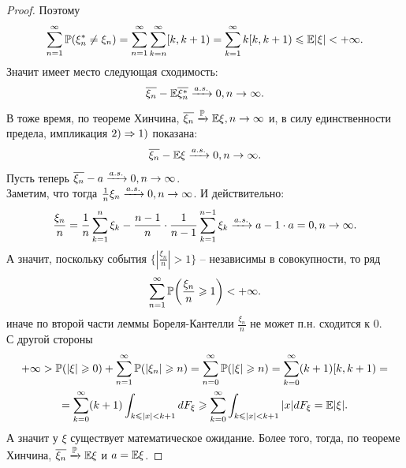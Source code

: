 \begin{proof}
    Поэтому 
    \[
        \sum\limits_{n = 1}^{\infty}\P(\xi_n^* \neq \xi_n) = \sum\limits_{n = 1}^{\infty}\sum\limits_{k = n}^{\infty} [k, k + 1) = \sum\limits_{k = 1}^{\infty} k [k, k + 1) \leq \Ex|\xi| < +\infty.
    \]
    Значит имеет место следующая сходимость:
    \[
        \overline{\xi_n} - \Ex \overline{\xi_n^*} \xrightarrow{a.s.} 0, n \ra \infty.
    \]
    В тоже время, по теореме Хинчина, $\overline{\xi_n} \xrightarrow{\P} \Ex \xi, n \ra \infty$ и, в силу единственности предела, импликация $2) \Ra 1)$ показана:
    \[
        \overline{\xi_n} - \Ex \xi \xrightarrow{a.s.} 0, n \ra \infty.
    \]
    Пусть теперь $\overline{\xi_n} - a \xrightarrow{a.s.} 0, n \ra \infty$. \\
    Заметим, что тогда $\frac{1}{n}\xi_n \xrightarrow{a.s.}0, n \ra \infty$. 
    И действительно:
    \[
        \dfrac{\xi_n}{n} = \dfrac{1}{n}\sum\limits_{k = 1}^n \xi_k - \dfrac{n - 1}{n} \cdot \dfrac{1}{n - 1}\sum\limits_{k = 1}^{n - 1}\xi_k \xrightarrow{a.s.} a - 1 \cdot a = 0, n \ra \infty.
    \]
    А значит, поскольку события $\biggr\{|\frac{\xi_n}{n}| > 1\biggr\}$ -- независимы в совокупности, то ряд 
    \[
        \sum\limits_{n = 1}^{\infty} \P\biggr(\frac{\xi_n}{n} \geq 1\biggr) < +\infty.
    \]
    иначе по второй части леммы Бореля-Кантелли $\frac{\xi_n}{n}$ не может п.н. сходится к 0. \\
    С другой стороны
    \begin{multline*}
        +\infty > \P(|\xi| \geq 0) + \sum\limits_{n = 1}^{\infty} \P(|\xi_n| \geq n) = \sum\limits_{n = 0}^{\infty} \P(|\xi| \geq n) = \sum\limits_{k = 0}^{\infty} (k + 1)[k, k + 1) = \\ = \sum\limits_{k = 0}^{\infty}(k + 1)\int_{k \leq |x| < k + 1}dF_\xi \geq \sum\limits_{k = 0}^{\infty} \int_{k \leq |x| < k + 1} |x|dF_\xi = \Ex|\xi|.
    \end{multline*}
    А значит у $\xi$ существует математическое ожидание. Более того, тогда, по теореме Хинчина, $\overline{\xi_n} \xrightarrow{\P} \Ex \xi$ и $a = \Ex \xi$.
\end{proof}
